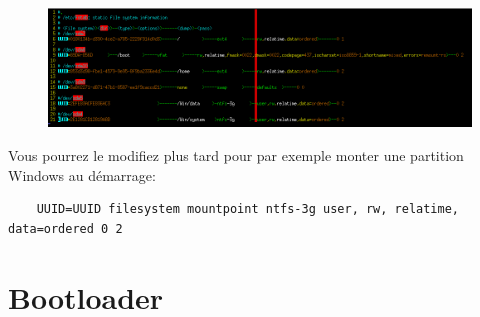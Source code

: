 \documentclass[a4paper]{book}
\begin{document}
  \begin{figure}[h]
    \includegraphics[width=\textwidth]{images/fstab}
  \end{figure}
  Vous pourrez le modifiez plus tard pour par exemple monter une partition
  Windows au démarrage\@:\\
  \begin{lstlisting}
    UUID=UUID filesystem mountpoint ntfs-3g user, rw, relatime, data=ordered 0 2
  \end{lstlisting}
  
  \chapter{Bootloader}
\end{document}

